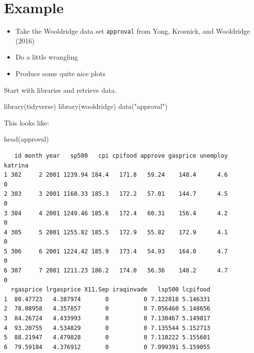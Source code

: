 \documentclass[
  letterpaper,
]{book}
\newenvironment{Shaded}{\begin{snugshade}}{\end{snugshade}}
\newcommand{\FunctionTok}[1]{\textcolor[rgb]{0.28,0.35,0.67}{#1}}
\newcommand{\NormalTok}[1]{\textcolor[rgb]{0.00,0.23,0.31}{#1}}
\newcommand{\StringTok}[1]{\textcolor[rgb]{0.13,0.47,0.30}{#1}}
\providecommand{\tightlist}{%
  \setlength{\itemsep}{0pt}\setlength{\parskip}{0pt}}\usepackage{longtable,booktabs,array}
\begin{document}
\hypertarget{example}{%
\section{Example}\label{example}}

\begin{itemize}
\tightlist
\item
  Take the Wooldridge data set \texttt{approval} from Yong, Krosnick,
  and Wooldridge (2016)
\item
  Do a little wrangling\\
\item
  Produce some quite nice plots
\end{itemize}

Start with libraries and retrieve data.

\begin{Shaded}
\begin{Highlighting}[]
\FunctionTok{library}\NormalTok{(tidyverse)}
\FunctionTok{library}\NormalTok{(wooldridge)}
\FunctionTok{data}\NormalTok{(}\StringTok{"approval"}\NormalTok{)}
\end{Highlighting}
\end{Shaded}

This looks like:

\begin{Shaded}
\begin{Highlighting}[]
\FunctionTok{head}\NormalTok{(approval) }
\end{Highlighting}
\end{Shaded}

\begin{verbatim}
   id month year   sp500   cpi cpifood approve gasprice unemploy katrina
1 302     2 2001 1239.94 184.4   171.8   59.24    148.4      4.6       0
2 303     3 2001 1160.33 185.3   172.2   57.01    144.7      4.5       0
3 304     4 2001 1249.46 185.6   172.4   60.31    156.4      4.2       0
4 305     5 2001 1255.82 185.5   172.9   55.82    172.9      4.1       0
5 306     6 2001 1224.42 185.9   173.4   54.93    164.0      4.7       0
6 307     7 2001 1211.23 186.2   174.0   56.36    148.2      4.7       0
  rgasprice lrgasprice X11.Sep iraqinvade   lsp500 lcpifood
1  80.47723   4.387974       0          0 7.122818 5.146331
2  78.08958   4.357857       0          0 7.056460 5.148656
3  84.26724   4.433993       0          0 7.130467 5.149817
4  93.20755   4.534829       0          0 7.135544 5.152713
5  88.21947   4.479828       0          0 7.110222 5.155601
6  79.59184   4.376912       0          0 7.099391 5.159055
\end{verbatim}
\end{document}

